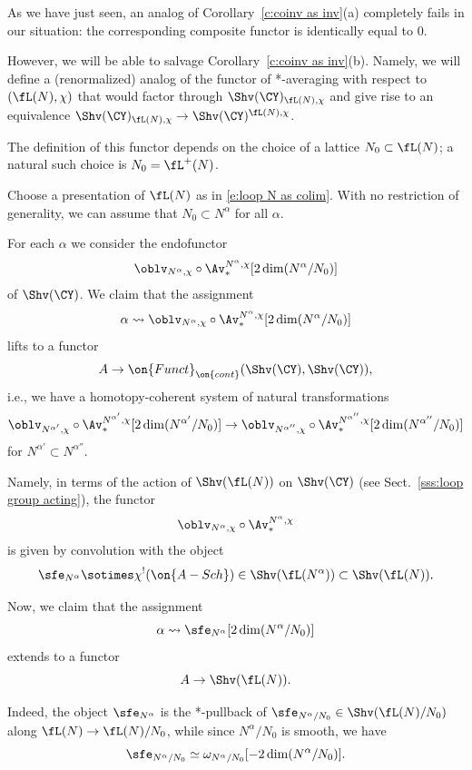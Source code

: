 \documentclass[9pt]{amsart}
\theoremstyle{definition}
\theoremstyle{remark}
\newcommand{\secref}[1]{Sect.~\ref{#1}}
\newcommand{\corref}[1]{Corollary~\ref{#1}}
\numberwithin{equation}{section}
\begin{document}
 \label{ss:pseudo-id}

As we have just seen, an analog of \corref{c:coinv as inv}(a) completely fails in our situation: the corresponding composite
functor is identically equal to $0$. 

\medskip

However, we will be able
to salvage \corref{c:coinv as inv}(b). Namely, we will define a (renormalized) analog of the functor 
of *-averaging with respect to $(\fL(N),\chi)$ that would factor through $\Shv(\CY)_{\fL(N),\chi}$ and give rise
to an equivalence $\Shv(\CY)_{\fL(N),\chi}\to \Shv(\CY)^{\fL(N),\chi}$. 

\medskip

The definition of this functor depends on the choice of a lattice $N_0\subset \fL(N)$; a natural such choice is
$N_0=\fL^+(N)$. 

\sssec{} 

Choose a presentation of $\fL(N)$ as in \eqref{e:loop N as colim}. With no restriction of generality,
we can assume that $N_0\subset N^\alpha$ for all $\alpha$. 

\medskip

For each $\alpha$ we consider the endofunctor 
$$\oblv_{N^\alpha,\chi}\circ \Av^{N^\alpha,\chi}_*[2\dim(N^\alpha/N_0)]$$ of $\Shv(\CY)$.
We claim that the assignment
$$\alpha\rightsquigarrow \oblv_{N^\alpha,\chi}\circ \Av^{N^\alpha,\chi}_*[2\dim(N^\alpha/N_0)]$$
lifts to a functor
$$A\to \on{Funct}_{\on{cont}}(\Shv(\CY),\Shv(\CY)),$$
i.e., we have a homotopy-coherent system of natural transformations 
$$\oblv_{N^{\alpha'},\chi}\circ \Av^{N^{\alpha'},\chi}_*[2\dim(N^{\alpha'}/N_0)]\to 
\oblv_{N^{\alpha''},\chi}\circ \Av^{N^{\alpha''},\chi}_*[2\dim(N^{\alpha''}/N_0)]$$
for $N^{\alpha'}\subset N^{\alpha''}$. 

\sssec{}

Namely, in terms of the action of $\Shv(\fL(N))$ on $\Shv(\CY)$
(see \secref{sss:loop group acting}), the functor $$\oblv_{N^\alpha,\chi}\circ \Av^{N^\alpha,\chi}_*$$ is given by convolution with the object
$$\sfe_{N^\alpha}\sotimes \chi^!(\on{A-Sch})\in \Shv(\fL(N^\alpha))\subset \Shv(\fL(N)).$$

Now, we claim that the assignment
$$\alpha\rightsquigarrow \sfe_{N^\alpha}[2\dim(N^\alpha/N_0)]$$
extends to a functor 
$$A\to \Shv(\fL(N)).$$

\medskip

Indeed, the object $\sfe_{N^\alpha}$ is the *-pullback of $\sfe_{N^\alpha/N_0}\in \Shv(\fL(N)/N_0)$ along $\fL(N)\to \fL(N)/N_0$,
while since $N^\alpha/N_0$ is smooth, we have
$$\sfe_{N^\alpha/N_0}\simeq \omega_{N^\alpha/N_0}[-2\dim(N^\alpha/N_0)].$$
\end{document}
